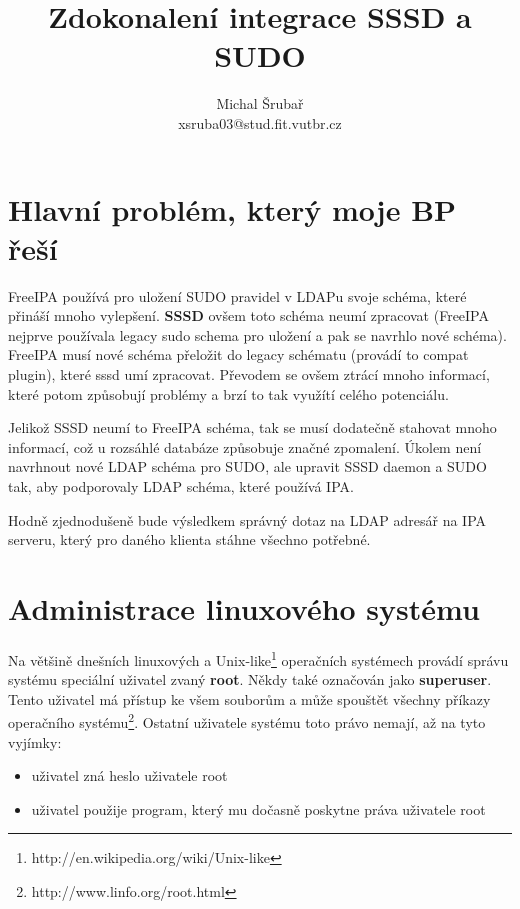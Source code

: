 \documentclass[12pt,a4paper,titlepage,final]{article}
\begin{document}
\author{Michal Šrubař\\xsruba03@stud.fit.vutbr.cz}
\date{}	
\title{Zdokonalení integrace SSSD a SUDO}
\maketitle
%

\pagestyle{plain}
\setcounter{page}{1}
\tableofcontents

\newpage
\pagestyle{plain}
\setcounter{page}{1}

\section*{Hlavní problém, který moje BP řeší}
FreeIPA používá pro uložení SUDO pravidel v LDAPu svoje schéma, které přináší
mnoho vylepšení. \textbf{SSSD} ovšem toto schéma neumí zpracovat (FreeIPA
nejprve používala legacy sudo schema pro uložení a pak se navrhlo nové schéma).
FreeIPA musí nové schéma přeložit do legacy schématu (provádí to compat plugin),
které sssd umí zpracovat. Převodem se ovšem ztrácí mnoho informací, které potom
způsobují problémy a brzí to tak využítí celého potenciálu.

Jelikož SSSD neumí to FreeIPA schéma, tak se musí dodatečně stahovat mnoho
informací, což u rozsáhlé databáze způsobuje značné zpomalení. Úkolem není
navrhnout nové LDAP schéma pro SUDO, ale upravit SSSD daemon a SUDO tak, aby
podporovaly LDAP schéma, které používá IPA.

Hodně zjednodušeně bude výsledkem správný dotaz na LDAP adresář na IPA serveru,
který pro daného klienta stáhne všechno potřebné.


\section{Administrace linuxového systému}
Na většině dnešních linuxových a
Unix-like\footnote{http://en.wikipedia.org/wiki/Unix-like} operačních systémech
provádí správu systému speciální uživatel zvaný \textbf{root}. Někdy také
označován jako \textbf{superuser}. Tento uživatel má přístup ke všem souborům a
může spouštět všechny příkazy operačního
systému\footnote{http://www.linfo.org/root.html}.  Ostatní uživatele systému
toto právo nemají, až na tyto vyjímky: \begin{itemize}
	\item uživatel zná heslo uživatele root
	\item uživatel použije program, který mu dočasně poskytne práva uživatele root
\end{itemize}
\end{document}

